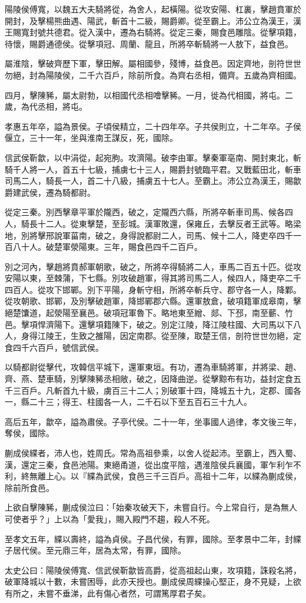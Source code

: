 
\begin{pinyinscope}
陽陵侯傅寬，以魏五大夫騎將從，為舍人，起橫陽。從攻安陽、杠裏，擊趙賁軍於開封，及擊楊熊曲遇、陽武，斬首十二級，賜爵卿。從至霸上。沛公立為漢王，漢王賜寬封號共德君。從入漢中，遷為右騎將。從定三秦，賜食邑雕陰。從擊項籍，待懷，賜爵通德侯。從擊項冠、周蘭、龍且，所將卒斬騎將一人敖下，益食邑。

屬淮陰，擊破齊歷下軍，擊田解。屬相國參，殘博，益食邑。因定齊地，剖符世世勿絕，封為陽陵侯，二千六百戶，除前所食。為齊右丞相，備齊。五歲為齊相國。

四月，擊陳豨，屬太尉勃，以相國代丞相噲擊豨。一月，徙為代相國，將屯。二歲，為代丞相，將屯。

孝惠五年卒，謚為景侯。子頃侯精立，二十四年卒。子共侯則立，十二年卒。子侯偃立，三十一年，坐與淮南王謀反，死，國除。

信武侯靳歙，以中涓從，起宛朐。攻濟陽。破李由軍。擊秦軍亳南、開封東北，斬騎千人將一人，首五十七級，捕虜七十三人，賜爵封號臨平君。又戰藍田北，斬車司馬二人，騎長一人，首二十八級，捕虜五十七人。至霸上。沛公立為漢王，賜歙爵建武侯，遷為騎都尉。

從定三秦。別西擊章平軍於隴西，破之，定隴西六縣，所將卒斬車司馬、候各四人，騎長十二人。從東擊楚，至彭城。漢軍敗還，保雍丘，去擊反者王武等。略梁地，別將擊邢說軍菑南，破之，身得說都尉二人，司馬、候十二人，降吏卒四千一百八十人。破楚軍滎陽東。三年，賜食邑四千二百戶。

別之河內，擊趙將賁郝軍朝歌，破之，所將卒得騎將二人，車馬二百五十匹。從攻安陽以東，至棘蒲，下七縣。別攻破趙軍，得其將司馬二人，候四人，降吏卒二千四百人。從攻下邯鄲。別下平陽，身斬守相，所將卒斬兵守、郡守各一人，降鄴。從攻朝歌、邯鄲，及別擊破趙軍，降邯鄲郡六縣。還軍敖倉，破項籍軍成皋南，擊絕楚馕道，起滎陽至襄邑。破項冠軍魯下。略地東至繒、郯、下邳，南至蘄、竹邑。擊項悍濟陽下。還擊項籍陳下，破之。別定江陵，降江陵柱國、大司馬以下八人，身得江陵王，生致之雒陽，因定南郡。從至陳，取楚王信，剖符世世勿絕，定食四千六百戶，號信武侯。

以騎都尉從擊代，攻韓信平城下，還軍東垣。有功，遷為車騎將軍，并將梁、趙、齊、燕、楚車騎，別擊陳豨丞相敞，破之，因降曲逆。從擊黥布有功，益封定食五千三百戶。凡斬首九十級，虜百三十二人；別破軍十四，降城五十九，定郡、國各一，縣二十三；得王、柱國各一人，二千石以下至五百石三十九人。

高后五年，歙卒，謚為肅侯。子亭代侯。二十一年，坐事國人過律，孝文後三年，奪侯，國除。

蒯成侯緤者，沛人也，姓周氏。常為高祖參乘，以舍人從起沛。至霸上，西入蜀、漢，還定三秦，食邑池陽。東絕甬道，從出度平陰，遇淮陰侯兵襄國，軍乍利乍不利，終無離上心。以『緤為武侯，食邑三千三百戶。高祖十二年，以緤為蒯成侯，除前所食邑。

上欲自擊陳豨，蒯成侯泣曰：「始秦攻破天下，未嘗自行。今上常自行，是為無人可使者乎？」上以為「愛我」，賜入殿門不趨，殺人不死。

至孝文五年，緤以壽終，謚為貞侯。子昌代侯，有罪，國除。至孝景中二年，封緤子居代侯。至元鼎三年，居為太常，有罪，國除。

太史公曰：陽陵侯傅寬、信武侯靳歙皆高爵，從高祖起山東，攻項籍，誅殺名將，破軍降城以十數，未嘗困辱，此亦天授也。蒯成侯周緤操心堅正，身不見疑，上欲有所之，未嘗不垂涕，此有傷心者然，可謂篤厚君子矣。


\end{pinyinscope}